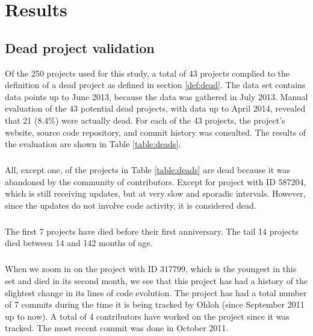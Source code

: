 \chapter{Results}
\label{results}

\section{Dead project validation}
\label{section:deads}
Of the 250 projects used for this study, a total of 43 projects complied to the
definition of a dead project as defined in section \ref{def:dead}. The data set
contains data points up to June 2013, because the data was gathered in July
2013. Manual evaluation of the 43 potential dead projects, with data up to April
2014, revealed that 21 (8.4\%) were actually dead.
For each of the 43 projects, the project's website, source code repository, and
commit history was consulted. The results of the evaluation are shown in Table
\ref{table:deads}.



\paragraph{}
All, except one, of the projects in Table \ref{table:deads} are dead because it
was abandoned by the community of contributors. Except for project with ID
587204, which is still receiving updates, but at very slow and sporadic
intervals. However, since the updates do not involve code activity, it is
considered dead.

\paragraph{}
The first 7 projects have died before their first anniversary. The tail 14
projects died between 14 and 142 months of age.

\paragraph{}
When we zoom in on the project with ID 317799, which is the youngest in this set
and died in its second month, we see that this project has had a history of the
slightest change in its lines of code evolution. The project has had a total
number of 7 commits during the time it is being tracked by Ohloh (since
September 2011 up to now). A total of 4 contributors have worked on the project
since it was tracked. The most recent commit was done in October 2011.


